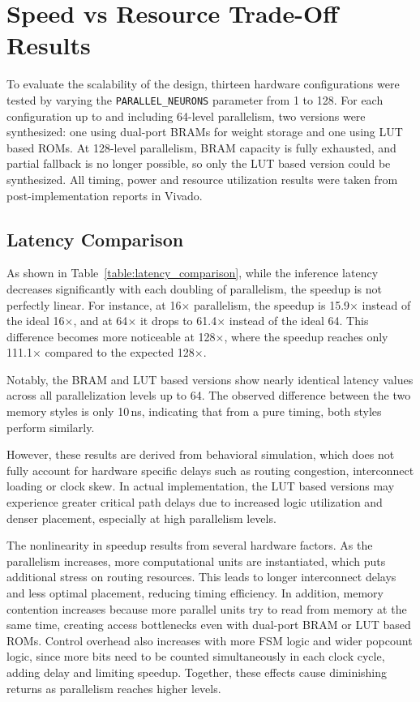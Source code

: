 \documentclass[a4paper,12pt]{report}
\begin{document}
\section{Speed vs Resource Trade-Off Results}
To evaluate the scalability of the design, thirteen hardware configurations were tested by varying the \texttt{PARALLEL\_NEURONS} parameter from 1 to 128. For each configuration up to and including 64-level parallelism, two versions were synthesized: one using dual-port BRAMs for weight storage and one using LUT based ROMs. At 128-level parallelism, BRAM capacity is fully exhausted, and partial fallback is no longer possible, so only the LUT based version could be synthesized. All timing, power and resource utilization results were taken from post-implementation reports in Vivado.


\subsection{Latency Comparison}
As shown in Table~\ref{table:latency_comparison}, while the inference latency decreases significantly with each doubling of parallelism, the speedup is not perfectly linear. For instance, at 16$\times$ parallelism, the speedup is 15.9$\times$ instead of the ideal 16$\times$, and at 64$\times$ it drops to 61.4$\times$ instead of the ideal 64. This difference becomes more noticeable at 128$\times$, where the speedup reaches only 111.1$\times$ compared to the expected 128$\times$.

Notably, the BRAM and LUT based versions show nearly identical latency values across all parallelization levels up to 64. The observed difference between the two memory styles is only 10\,ns, indicating that from a pure timing, both styles perform similarly.

However, these results are derived from behavioral simulation, which does not fully account for hardware specific delays such as routing congestion, interconnect loading or clock skew. In actual implementation, the LUT based versions may experience greater critical path delays due to increased logic utilization and denser placement, especially at high parallelism levels.

The nonlinearity in speedup results from several hardware factors. As the parallelism increases, more computational units are instantiated, which puts additional stress on routing resources. This leads to longer interconnect delays and less optimal placement, reducing timing efficiency. In addition, memory contention increases because more parallel units try to read from memory at the same time, creating access bottlenecks even with dual-port BRAM or LUT based ROMs. Control overhead also increases with more FSM logic and wider popcount logic, since more bits need to be counted simultaneously in each clock cycle, adding delay and limiting speedup. Together, these effects cause diminishing returns as parallelism reaches higher levels.
\end{document}
